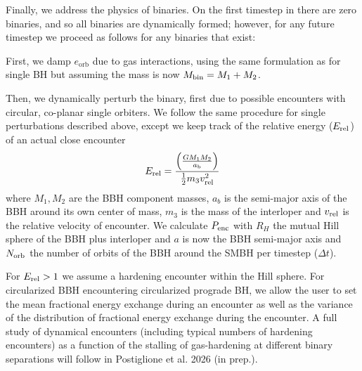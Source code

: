 Finally, we address the physics of binaries. On the first timestep in  there are zero binaries, and so all binaries are dynamically formed; however, for any future timestep we proceed as follows for any binaries that exist:

First, we damp $e_\mathrm{orb}$ due to gas interactions, using the same formulation as for single BH but assuming the mass is now $M_{\rm bin}=M_{1}+M_{2}$.

Then, we dynamically perturb the binary, first due to possible encounters with circular, co-planar single orbiters.
We follow the same procedure for single perturbations described above, except we keep track of the relative energy ($E_{\rm rel}$) of an actual close encounter
 \begin{equation}
     E_{\rm rel} =\frac{\left(\frac{GM_{1}M_{2}}{a_{\rm b}}\right)}{\frac{1}{2} m_{3}v_{\rm rel}^{2}}
 \end{equation}
where $M_{1},M_{2}$ are the BBH component masses, $a_{b}$ is the semi-major axis of the BBH around its own center of mass, $m_{3}$ is the mass of the interloper and $v_{\rm rel}$ is the relative velocity of encounter.
We calculate $P_{\rm enc}$ with $R_{H}$ the mutual Hill sphere of the BBH plus interloper and $a$ is now the BBH semi-major axis and $N_{\rm orb}$ the number of orbits of the BBH around the SMBH per timestep ($\Delta t$).

 For $E_{\rm rel}>1$ we assume a hardening encounter within the Hill sphere.
 For circularized BBH encountering circularized prograde BH, we allow the user to set the mean fractional energy exchange during an encounter as well as the variance of the distribution of fractional energy exchange during the encounter.
 A full study of dynamical encounters (including typical numbers of hardening encounters) as a function of the stalling of gas-hardening at different binary separations will follow in Postiglione et al. 2026 (in prep.). 
 
